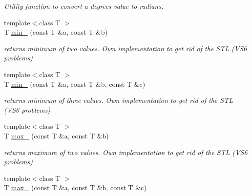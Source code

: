 \begin{DoxyCompactItemize}
\begin{DoxyCompactList}\small\item\em Utility function to convert a degrees value to radians. \end{DoxyCompactList}\item 
{\footnotesize template$<$class T $>$ }\\T \hyperlink{namespaceirr_1_1core_ae33411bd0679c7f624f9d1cdd2623c64}{min\+\_\+} (const T \&a, const T \&b)\hypertarget{namespaceirr_1_1core_ae33411bd0679c7f624f9d1cdd2623c64}{}\label{namespaceirr_1_1core_ae33411bd0679c7f624f9d1cdd2623c64}

\begin{DoxyCompactList}\small\item\em returns minimum of two values. Own implementation to get rid of the S\+TL (V\+S6 problems) \end{DoxyCompactList}\item 
{\footnotesize template$<$class T $>$ }\\T \hyperlink{namespaceirr_1_1core_ac69357f2586a84923276434070c7ee2e}{min\+\_\+} (const T \&a, const T \&b, const T \&c)\hypertarget{namespaceirr_1_1core_ac69357f2586a84923276434070c7ee2e}{}\label{namespaceirr_1_1core_ac69357f2586a84923276434070c7ee2e}

\begin{DoxyCompactList}\small\item\em returns minimum of three values. Own implementation to get rid of the S\+TL (V\+S6 problems) \end{DoxyCompactList}\item 
{\footnotesize template$<$class T $>$ }\\T \hyperlink{namespaceirr_1_1core_af8634075654b25803d3e6eb8c9b034d6}{max\+\_\+} (const T \&a, const T \&b)\hypertarget{namespaceirr_1_1core_af8634075654b25803d3e6eb8c9b034d6}{}\label{namespaceirr_1_1core_af8634075654b25803d3e6eb8c9b034d6}

\begin{DoxyCompactList}\small\item\em returns maximum of two values. Own implementation to get rid of the S\+TL (V\+S6 problems) \end{DoxyCompactList}\item 
{\footnotesize template$<$class T $>$ }\\T \hyperlink{namespaceirr_1_1core_a45842b4bd9315f61effcd66ebd968ace}{max\+\_\+} (const T \&a, const T \&b, const T \&c)\hypertarget{namespaceirr_1_1core_a45842b4bd9315f61effcd66ebd968ace}{}\label{namespaceirr_1_1core_a45842b4bd9315f61effcd66ebd968ace}


\end{DoxyCompactItemize}
